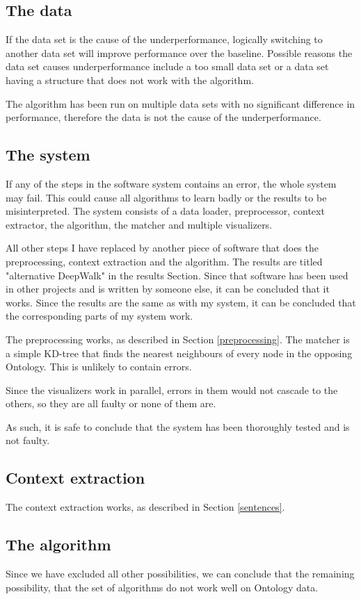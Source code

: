 \documentclass{article}
\begin{document}
  \subsection{The data}
  If the data set is the cause of the underperformance, logically switching to another data set will improve performance over the baseline. Possible reasons the data set causes underperformance include a too small data set or a data set having a structure that does not work with the algorithm.
  
  The algorithm has been run on multiple data sets with no significant difference in performance, therefore the data is not the cause of the underperformance.
  \subsection{The system}
  If any of the steps in the software system contains an error, the whole system may fail. This could cause all algorithms to learn badly or the results to be misinterpreted. The system consists of a data loader, preprocessor, context extractor, the algorithm, the matcher and multiple visualizers. 
  
  All other steps I have replaced by another piece of software that does the preprocessing, context extraction and the algorithm. The results are titled "alternative DeepWalk" in the results Section. Since that software has been used in other projects and is written by someone else, it can be concluded that it works. Since the results are the same as with my system, it can be concluded that the corresponding parts of my system work.
  
  The preprocessing works, as described in Section \ref{preprocessing}.  The matcher is a simple KD-tree that finds the nearest neighbours of every node in the opposing Ontology. This is unlikely to contain errors.
  
  Since the visualizers work in parallel, errors in them would not cascade to the others, so they are all faulty or none of them are.
  
  As such, it is safe to conclude that the system has been thoroughly tested and is not faulty.
  \subsection{Context extraction}
  The context extraction works, as described in Section \ref{sentences}.
  \subsection{The algorithm}
  Since we have excluded all other possibilities, we can conclude that the remaining possibility, that the set of algorithms do not work well on Ontology data.
  
\end{document}
